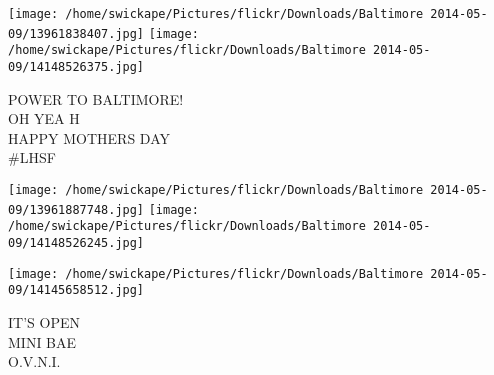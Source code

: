 \documentclass[10pt,letterpaper]{article}
\begin{document}
\texttt{[image: /home/swickape/Pictures/flickr/Downloads/Baltimore 2014-05-09/13961838407.jpg]}
\texttt{[image: /home/swickape/Pictures/flickr/Downloads/Baltimore 2014-05-09/14148526375.jpg]}

POWER TO BALTIMORE!\\
OH YEA H\\
HAPPY MOTHERS DAY\\
\#LHSF
\pagebreak

\texttt{[image: /home/swickape/Pictures/flickr/Downloads/Baltimore 2014-05-09/13961887748.jpg]}
\texttt{[image: /home/swickape/Pictures/flickr/Downloads/Baltimore 2014-05-09/14148526245.jpg]}

\texttt{[image: /home/swickape/Pictures/flickr/Downloads/Baltimore 2014-05-09/14145658512.jpg]}

IT'S OPEN\\
MINI BAE\\
O.V.N.I.
\pagebreak
\end{document}
